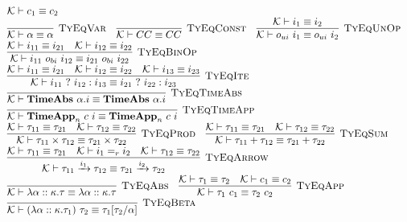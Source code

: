 \documentclass[fleqn]{article}
\begin{document}
\[
\begin{array}{l}
    \mathcal{K} \vdash c_1 \equiv c_2 \\
    \infer[\textsc{TyEqVar}]{\mathcal{K} \vdash \alpha \equiv \alpha}{} \hspace{1em}
    \infer[\textsc{TyEqConst}]{\mathcal{K} \vdash CC \equiv CC}{} \hspace{1em}
    \infer[\textsc{TyEqUnOp}]{\mathcal{K} \vdash o_{ui}~i_1 \equiv o_{ui}~i_2}{\mathcal{K} \vdash i_1 \equiv i_2} \\
    \infer[\textsc{TyEqBinOp}]{\mathcal{K} \vdash i_{11}~o_{bi}~i_{12} \equiv i_{21}~o_{bi}~i_{22}}{\mathcal{K} \vdash i_{11} \equiv i_{21} & \mathcal{K} \vdash i_{12} \equiv i_{22}} \\
    \infer[\textsc{TyEqIte}]{\mathcal{K} \vdash i_{11}~?~i_{12} : i_{13} \equiv i_{21}~?~i_{22} : i_{23}}{\mathcal{K} \vdash i_{11} \equiv i_{21} & \mathcal{K} \vdash i_{12} \equiv i_{22} & \mathcal{K} \vdash i_{13} \equiv i_{23}} \\
    \infer[\textsc{TyEqTimeAbs}]{\mathcal{K} \vdash \mathbf{TimeAbs}~\alpha. i \equiv \mathbf{TimeAbs}~\alpha. i}{} \\
    \infer[\textsc{TyEqTimeApp}]{\mathcal{K} \vdash \mathbf{TimeApp}_n~c~i \equiv \mathbf{TimeApp}_n~c~i}{} \\
    \infer[\textsc{TyEqProd}]{\mathcal{K} \vdash \tau_{11} \times \tau_{12} \equiv \tau_{21} \times \tau_{22}}{\mathcal{K} \vdash \tau_{11} \equiv \tau_{21} & \mathcal{K} \vdash \tau_{12} \equiv \tau_{22}} \hspace{1em}
    \infer[\textsc{TyEqSum}]{\mathcal{K} \vdash \tau_{11} + \tau_{12} \equiv \tau_{21} + \tau_{22}}{\mathcal{K} \vdash \tau_{11} \equiv \tau_{21} & \mathcal{K} \vdash \tau_{12} \equiv \tau_{22}} \\
    \infer[\textsc{TyEqArrow}]{\mathcal{K} \vdash \tau_{11} \xrightarrow{i_1} \tau_{12} \equiv \tau_{21} \xrightarrow{i_2} \tau_{22}}{\mathcal{K} \vdash \tau_{11} \equiv \tau_{21} & \mathcal{K} \vdash i_1 =_r i_2 & \mathcal{K} \vdash \tau_{12} \equiv \tau_{22}} \\
    \infer[\textsc{TyEqAbs}]{\mathcal{K} \vdash \lambda \alpha :: \kappa. \tau \equiv \lambda \alpha :: \kappa. \tau}{} \hspace{1em}
    \infer[\textsc{TyEqApp}]{\mathcal{K} \vdash \tau_{1}~c_{1} \equiv \tau_{2}~c_{2}}{\mathcal{K} \vdash \tau_{1} \equiv \tau_{2} & \mathcal{K} \vdash c_{1} \equiv c_{2}} \\
    \infer[\textsc{TyEqBeta}]{\mathcal{K} \vdash (\lambda \alpha :: \kappa. \tau_1)~\tau_2 \equiv \tau_1[\tau_2/\alpha]}{} \hspace{1em}

\end{array}\]
\end{document}
